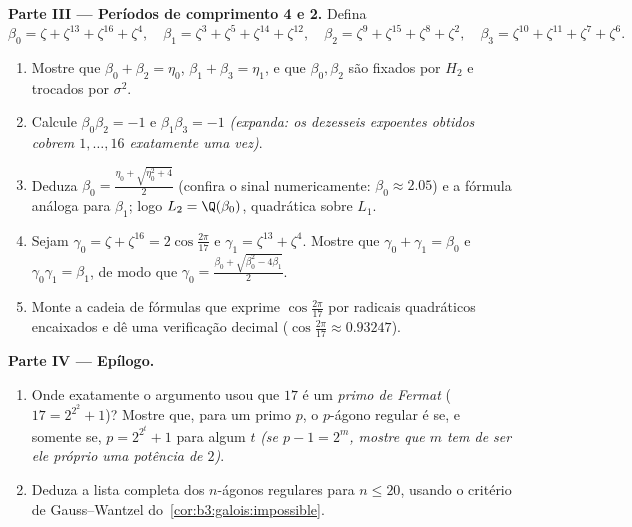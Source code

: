 \begin{problem}
\medskip
\noindent\textbf{Parte III --- Períodos de comprimento 4 e 2.}
Defina
\[
\beta_0 = \zeta + \zeta^{13} + \zeta^{16} + \zeta^{4},\quad
\beta_1 = \zeta^3 + \zeta^5 + \zeta^{14} + \zeta^{12},\quad
\beta_2 = \zeta^9 + \zeta^{15} + \zeta^{8} + \zeta^{2},\quad
\beta_3 = \zeta^{10} + \zeta^{11} + \zeta^{7} + \zeta^{6}.
\]
\begin{enumerate}[resume]
  \item Mostre que $\beta_0 + \beta_2 = \eta_0$, $\beta_1 + \beta_3 =
        \eta_1$, e que $\beta_0, \beta_2$ são fixados por
        $H_2$ e trocados por $\sigma^2$.
  \item Calcule $\beta_0\beta_2 = -1$ e $\beta_1\beta_3 = -1$ \emph{(expanda: os dezesseis expoentes
        obtidos cobrem $1, \dots, 16$ exatamente uma vez)}.
  \item Deduza $\beta_0 = \frac{\eta_0 + \sqrt{\eta_0^2 + 4}}2$ (confira o sinal numericamente: $\beta_0 \approx 2.05$) e a
        fórmula análoga para $\beta_1$; logo $L_2 =
        \Q(\beta_0)$, quadrática sobre
        $L_1$.
  \item Sejam $\gamma_0 = \zeta + \zeta^{16} =
        2\cos\frac{2\pi}{17}$ e $\gamma_1 = \zeta^{13} +
        \zeta^4$. Mostre que $\gamma_0 + \gamma_1 = \beta_0$ e $\gamma_0\gamma_1 = \beta_1$, de modo que
        $\gamma_0 =
        \frac{\beta_0 + \sqrt{\beta_0^2 - 4\beta_1}}2$.
  \item Monte a cadeia de fórmulas que exprime $\cos\frac{2\pi}{17}$ por radicais
        quadráticos encaixados e dê uma verificação decimal ($\cos\frac{2\pi}{17} \approx 0.93247$).
\end{enumerate}

\medskip
\noindent\textbf{Parte IV --- Epílogo.}
\begin{enumerate}[resume]
  \item Onde exatamente o argumento usou que $17$ é um \emph{primo
        de Fermat} ($17 = 2^{2^2} + 1$)? Mostre que, para um primo $p$, o
        $p$-ágono regular é  se, e somente se, $p
        = 2^{2^t} + 1$
        para algum $t$ \emph{(se $p - 1 = 2^m$, mostre que $m$ tem de
        ser ele próprio uma potência de $2$)}.
  \item Deduza a lista completa dos $n$-ágonos regulares
         para $n \leq 20$, usando o critério de Gauss--Wantzel
        do~\cref{cor:b3:galois:impossible}.
\end{enumerate}


\end{problem}
